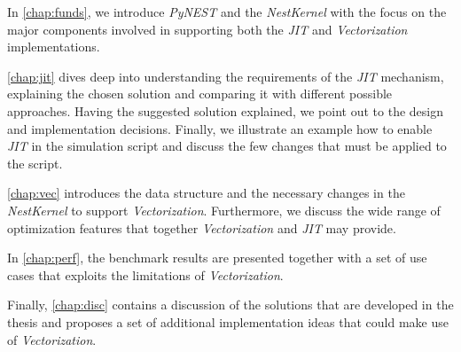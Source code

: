 In \autoref{chap:funds}, we introduce \emph{PyNEST} and the \emph{NestKernel} with the focus on the major components involved in supporting both the \emph{JIT} and \emph{Vectorization} implementations.

\autoref{chap:jit} dives deep into understanding the requirements of the \emph{JIT} mechanism, explaining the chosen solution and comparing it with different possible approaches. Having the suggested solution explained, we point out to the design and implementation decisions. Finally, we illustrate an example how to enable \emph{JIT} in the simulation script and discuss the few changes that must be applied to the script.

\autoref{chap:vec} introduces the data structure and the necessary changes in the \emph{NestKernel} to support \emph{Vectorization}. Furthermore, we discuss the wide range of optimization features that together \emph{Vectorization} and \emph{JIT} may provide.

In \autoref{chap:perf}, the benchmark results are presented together with a set of use cases that exploits the limitations of \emph{Vectorization}.

Finally, \autoref{chap:disc} contains a discussion of the solutions that are developed in the thesis and proposes a set of additional implementation ideas that could make use of \emph{Vectorization}.



\cleardoublepage
